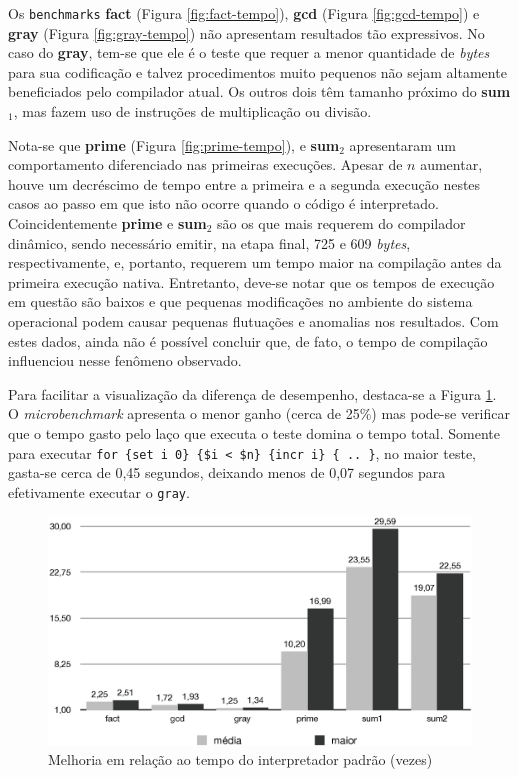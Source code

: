 Os \texttt{benchmarks} \textbf{fact} (Figura \ref{fig:fact-tempo}),
\textbf{gcd} (Figura \ref{fig:gcd-tempo}) e \textbf{gray} (Figura
\ref{fig:gray-tempo}) não apresentam resultados tão expressivos. No
caso do \textbf{gray}, tem-se que ele é o teste que requer a menor
quantidade de \textit{bytes} para sua codificação e talvez
procedimentos muito pequenos não sejam altamente beneficiados pelo
compilador atual. Os outros dois têm tamanho próximo do
\textbf{sum$_1$}, mas fazem uso de instruções de multiplicação ou
divisão.

Nota-se que \textbf{prime} (Figura \ref{fig:prime-tempo}),
e \textbf{sum$_2$} apresentaram um comportamento
diferenciado nas primeiras execuções. Apesar de $n$ aumentar,
houve um decréscimo de tempo entre a primeira e a segunda
execução nestes casos ao passo em que isto não ocorre quando o código é
interpretado.
Coincidentemente \textbf{prime} e \textbf{sum$_2$} são os que
mais requerem do compilador dinâmico, sendo necessário emitir, na
etapa final, 725 e 609
\textit{bytes}, respectivamente, e, portanto, requerem um tempo maior
na compilação antes da primeira execução nativa. Entretanto, deve-se
notar que os tempos de execução em questão são baixos e que pequenas
modificações no ambiente do sistema operacional podem causar pequenas
flutuações e anomalias nos resultados. Com estes dados, ainda não é
possível concluir que, de fato, o tempo de compilação influenciou
nesse fenômeno observado.




Para facilitar a visualização da diferença de desempenho,
destaca-se a Figura \ref{fig:media-tempo}. O \textit{microbenchmark}
apresenta o menor ganho (cerca de 25\%) mas pode-se verificar que o
tempo gasto pelo laço que
executa o teste domina o tempo total. Somente para executar
\verb!for {set i 0} {$i < $n} {incr i} { .. }!, no maior
teste, gasta-se cerca
de 0,45 segundos, deixando menos de 0,07 segundos para efetivamente
executar o \verb!gray!.

\begin{figure}[ht]
  \centering
  \includegraphics[scale=0.70]{figs/melhoria}
  \caption{Melhoria em relação ao tempo do interpretador padrão (vezes) \label{fig:media-tempo}}
\end{figure}

